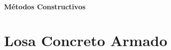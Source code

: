 \documentclass[12pt]{article}
\newcounter{intro}
\renewcommand{\theintro}{\arabic{intro}} %
\begin{document}
	
	\pagestyle{empty}
	
	
	
	

	
	
	
	
	
%
%

		\begin{center}
		\textbf{\LARGE  Métodos Constructivos}
	\end{center}


 

	




	\section{Losa Concreto Armado}
\end{document}
